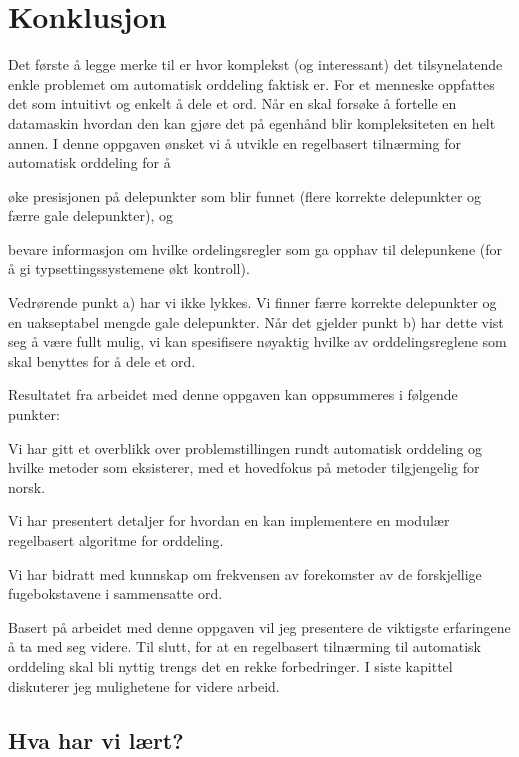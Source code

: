 
\chapter{Konklusjon}
Det første å legge merke til er hvor komplekst (og interessant) det tilsynelatende enkle problemet om automatisk orddeling faktisk er. For et menneske oppfattes det som intuitivt og enkelt å dele et ord. Når en skal forsøke å fortelle en datamaskin hvordan den kan gjøre det på egenhånd blir kompleksiteten en helt annen. I denne oppgaven ønsket vi å utvikle en regelbasert tilnærming for automatisk orddeling for å
\begin{inparaenum}
\item øke presisjonen på delepunkter som blir funnet (flere korrekte delepunkter og færre gale delepunkter), og
\item bevare informasjon om hvilke ordelingsregler som ga opphav til delepunkene (for å gi typsettingssystemene økt kontroll).
\end{inparaenum}
Vedrørende punkt a) har vi ikke lykkes. Vi finner færre korrekte delepunkter og en uakseptabel mengde gale delepunkter. Når det gjelder punkt b) har dette vist seg å være fullt mulig, vi kan spesifisere nøyaktig hvilke av orddelingsreglene som skal benyttes for å dele et ord.

Resultatet fra arbeidet med denne oppgaven kan oppsummeres i følgende punkter:
\begin{enum}
\item Vi har gitt et overblikk over problemstillingen rundt automatisk orddeling og hvilke metoder som eksisterer, med et hovedfokus på metoder tilgjengelig for norsk. 
\item Vi har presentert detaljer for hvordan en kan implementere en modulær regelbasert algoritme for orddeling. 
\item Vi har bidratt med kunnskap om frekvensen av forekomster av de forskjellige fugebokstavene i sammensatte ord.
\end{enum}

Basert på arbeidet med denne oppgaven vil jeg presentere de viktigste erfaringene å ta med seg videre. Til slutt, for at en regelbasert tilnærming til automatisk orddeling skal bli nyttig trengs det en rekke forbedringer. I siste kapittel diskuterer jeg mulighetene for videre arbeid.

\section{Hva har vi lært?}

